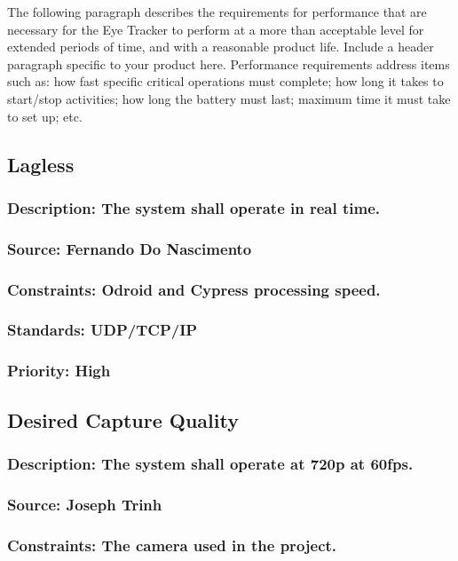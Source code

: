 The following paragraph describes the requirements for performance that are necessary for the Eye Tracker to perform at a more than acceptable level for extended periods of time, and with a reasonable product life.
Include a header paragraph specific to your product here. Performance requirements address items such as: how fast specific critical operations must complete; how long it takes to start/stop activities; how long the battery must last; maximum time it must take to set up; etc.

\subsection{Lagless}
\subsubsection{Description: The system shall operate in real time.}
\subsubsection{Source: Fernando Do Nascimento}
\subsubsection{Constraints: Odroid and Cypress processing speed.}
\subsubsection{Standards: UDP/TCP/IP}
\subsubsection{Priority: High}

\subsection{Desired Capture Quality}
\subsubsection{Description: The system shall operate at 720p at 60fps.}
\subsubsection{Source: Joseph Trinh}
\subsubsection{Constraints: The camera used in the project.}
